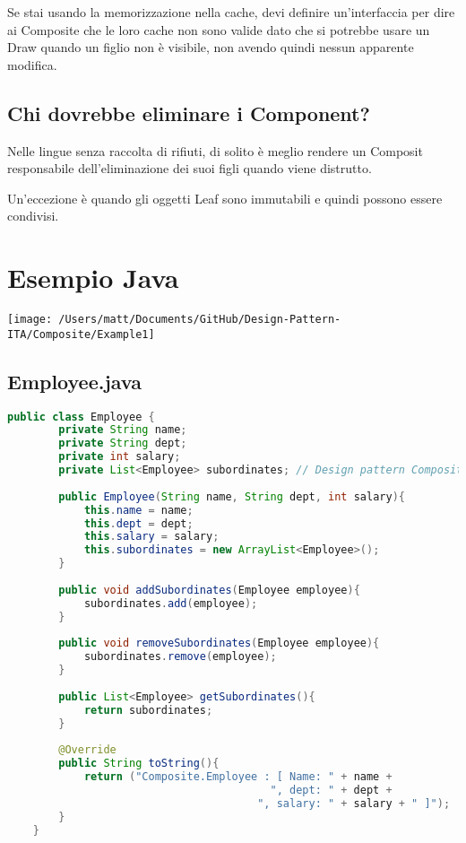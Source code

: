 Se stai usando la memorizzazione nella cache, devi definire un'interfaccia per dire ai Composite che le loro cache non sono valide dato che si potrebbe usare un Draw quando un figlio non è visibile, non avendo quindi nessun apparente modifica.

\subsection{Chi dovrebbe eliminare i Component?}
Nelle lingue senza raccolta di rifiuti, di solito è meglio rendere un Composit responsabile dell'eliminazione dei suoi figli quando viene distrutto.

Un'eccezione è quando gli oggetti Leaf sono immutabili e quindi possono essere condivisi.


\section{Esempio Java}
\texttt{[image: /Users/matt/Documents/GitHub/Design-Pattern-ITA/Composite/Example1]}

\subsection{Employee.java}
\begin{lstlisting}[language=java]
    public class Employee {
        private String name;
        private String dept;
        private int salary;
        private List<Employee> subordinates; // Design pattern Composite
    
        public Employee(String name, String dept, int salary){
            this.name = name;
            this.dept = dept;
            this.salary = salary;
            this.subordinates = new ArrayList<Employee>();
        }
    
        public void addSubordinates(Employee employee){
            subordinates.add(employee);
        }
    
        public void removeSubordinates(Employee employee){
            subordinates.remove(employee);
        }
    
        public List<Employee> getSubordinates(){
            return subordinates;
        }
    
        @Override
        public String toString(){
            return ("Composite.Employee : [ Name: " + name +
                                         ", dept: " + dept +
                                       ", salary: " + salary + " ]");
        }
    }
\end{lstlisting}


